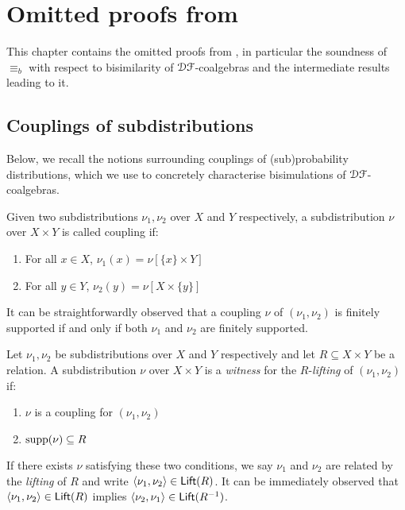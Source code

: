 {}

\appendix
\chapter{Omitted proofs from }
\label{apx:soundness}
This chapter contains the omitted proofs from , in particular the soundness of $\equiv_b$ with respect to bisimilarity of $\mathcal{D} \mathcal{F}$-coalgebras and the intermediate results leading to it.
\section{Couplings of subdistributions}
Below, we recall the notions surrounding couplings of (sub)probability distributions, which we use to concretely characterise bisimulations of $\mathcal{D} \mathcal{F}$-coalgebras.
\begin{definition}\label{def:coupling}
    Given two subdistributions $\nu_1, \nu_2$ over $X$ and $Y$ respectively, a subdistribution $\nu$ over $X \times Y$ is called coupling if:
    \begin{enumerate}
        \item For all $x \in X$, $\nu_1(x) = \nu[\{x\}\times Y]$
        \item For all $y \in Y$, $\nu_2(y)= \nu[X \times \{y\}]$
    \end{enumerate} 
\end{definition}
It can be straightforwardly observed that a coupling $\nu$ of $(\nu_1, \nu_2)$ is finitely supported if and only if both $\nu_1$ and $\nu_2$ are finitely supported.
\begin{definition}\label{def:lifting}
    Let $\nu_1, \nu_2$ be subdistributions over $X$ and $Y$ respectively and let $R \subseteq X \times Y$ be a relation. A subdistribution $\nu$ over $X \times Y$ is a \emph{witness} for the $R$-\emph{lifting} of $(\nu_1, \nu_2)$ if:
    \begin{enumerate}
        \item $\nu$ is a coupling for $(\nu_1, \nu_2)$
        \item $\operatorname{supp}(\nu) \subseteq R$
    \end{enumerate}
\end{definition}
If there exists $\nu$ satisfying these two conditions, we say $\nu_1$ and $\nu_2$ are related by the \emph{lifting} of $R$ and write $\langle\nu_1 , \nu_2 \rangle \in \mathsf{Lift}(R)$. It can be immediately observed that $\langle \nu_1 , \nu_2 \rangle \in \mathsf{Lift}(R)$ implies $\langle \nu_2 , \nu_1 \rangle \in \mathsf{Lift}({R^{-1}})$.

